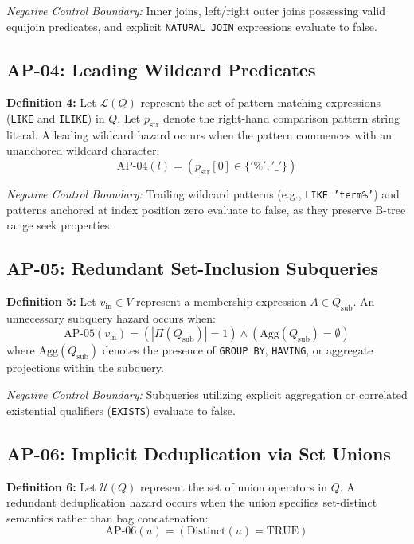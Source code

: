 \documentclass[conference]{IEEEtran}
\begin{document}
\textit{Negative Control Boundary:} Inner joins, left/right outer joins possessing valid equijoin predicates, and explicit \texttt{NATURAL JOIN} expressions evaluate to false.

\subsection{AP-04: Leading Wildcard Predicates}
\textbf{Definition 4:} Let $\mathcal{L}(Q)$ represent the set of pattern matching expressions (\texttt{LIKE} and \texttt{ILIKE}) in $Q$. Let $p_{\text{str}}$ denote the right-hand comparison pattern string literal. A leading wildcard hazard occurs when the pattern commences with an unanchored wildcard character:
\begin{equation}
    \text{AP-04}(l) = (p_{\text{str}}[0] \in \{'\%', '\_'\})
\end{equation}

\textit{Negative Control Boundary:} Trailing wildcard patterns (e.g., \texttt{LIKE 'term\%'}) and patterns anchored at index position zero evaluate to false, as they preserve B-tree range seek properties.

\subsection{AP-05: Redundant Set-Inclusion Subqueries}
\textbf{Definition 5:} Let $v_{\text{in}} \in V$ represent a membership expression $A \in Q_{\text{sub}}$. An unnecessary subquery hazard occurs when:
\begin{equation}
    \text{AP-05}(v_{\text{in}}) = (|\Pi(Q_{\text{sub}})| = 1) \land (\text{Agg}(Q_{\text{sub}}) = \emptyset)
\end{equation}
where $\text{Agg}(Q_{\text{sub}})$ denotes the presence of \texttt{GROUP BY}, \texttt{HAVING}, or aggregate projections within the subquery.

\textit{Negative Control Boundary:} Subqueries utilizing explicit aggregation or correlated existential qualifiers (\texttt{EXISTS}) evaluate to false.

\subsection{AP-06: Implicit Deduplication via Set Unions}
\textbf{Definition 6:} Let $\mathcal{U}(Q)$ represent the set of union operators in $Q$. A redundant deduplication hazard occurs when the union specifies set-distinct semantics rather than bag concatenation:
\begin{equation}
    \text{AP-06}(u) = (\text{Distinct}(u) = \text{TRUE})
\end{equation}
\end{document}
